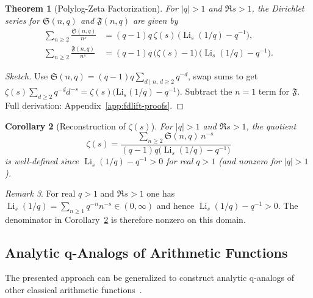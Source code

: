 \documentclass[11pt,a4paper]{amsart}
\theoremstyle{plain}
\newtheorem{theorem}{Theorem}[section]
\newtheorem{corollary}[theorem]{Corollary}
\theoremstyle{definition}
\theoremstyle{remark}
\newtheorem{remark}[theorem]{Remark}
\begin{document}
\begin{theorem}[Polylog-Zeta Factorization]\label{thm:polylog-zeta}
For $|q|>1$ and $\Re s>1$, the Dirichlet series for $\mathfrak{S}(n,q)$ and $\mathfrak{F}(n,q)$ are given by
\begin{align*}
\sum_{n\ge2}\frac{\mathfrak{S}(n,q)}{n^{s}}
&=(q-1)q\,\zeta(s)\,\bigl(\operatorname{Li}_{s}(1/q)-q^{-1}\bigr), \\
\sum_{n\ge2}\frac{\mathfrak{F}(n,q)}{n^{s}}
&=(q-1)q\,\bigl(\zeta(s)-1\bigr)\,\bigl(\operatorname{Li}_{s}(1/q)-q^{-1}\bigr).
\end{align*}
\end{theorem}
\begin{proof}[Sketch]
Use $\mathfrak S(n,q)=(q\!-\!1)q\sum_{d\mid n,\, d\ge2}q^{-d}$, swap sums to get $\zeta(s)\sum_{d\ge2}q^{-d}d^{-s}=\zeta(s)\big(\mathrm{Li}_s(1/q)-q^{-1}\big)$.
Subtract the $n=1$ term for $\mathfrak F$.
Full derivation: Appendix~\ref{app:fdlift-proofs}.
\end{proof}

\begin{corollary}[Reconstruction of $\zeta(s)$]\label{cor:reconstruct-zeta}
For $|q|>1$ and $\Re s>1$, the quotient
\[
\zeta(s)=\frac{\displaystyle \sum_{n\ge2}\mathfrak{S}(n,q)\,n^{-s}}{(q-1)q\big(\operatorname{Li}_s(1/q)-q^{-1}\big)}
\]
is well-defined since $\operatorname{Li}_s(1/q)-q^{-1}>0$ for real $q>1$ (and nonzero for $|q|>1$). 
\end{corollary}
\begin{remark}
For real $q>1$ and $\Re s>1$ one has $\operatorname{Li}_s(1/q)=\sum_{n\ge1}q^{-n}n^{-s}\in(0,\infty)$ and hence $\operatorname{Li}_s(1/q)-q^{-1}>0$. The denominator in Corollary~\ref{cor:reconstruct-zeta} is therefore nonzero on this domain.
\end{remark}

\subsection{Analytic q-Analogs of Arithmetic Functions}
The presented approach can be generalized to construct analytic q-analogs of other classical arithmetic functions~\cite{gasper2004}.
\end{document}
